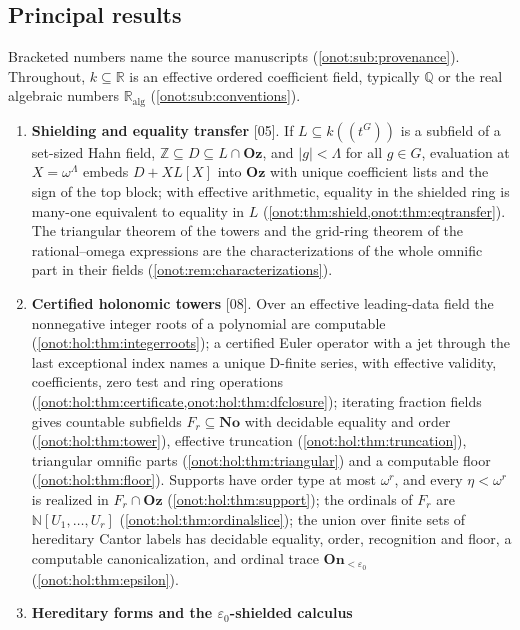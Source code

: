 \documentclass[11pt,oneside]{article}
\numberwithin{equation}{section}
\theoremstyle{definition}
\theoremstyle{remark}
\newcommand{\No}{\mathbf{No}}
\newcommand{\Oz}{\mathbf{Oz}}
\newcommand{\On}{\mathbf{On}}
\newcommand{\N}{\mathbb N}
\newcommand{\Z}{\mathbb Z}
\newcommand{\Q}{\mathbb Q}
\newcommand{\R}{\mathbb R}
\newcommand{\Ralg}{\R_{\mathrm{alg}}}
\newcommand{\src}[1]{\textup{\textsf{\small[#1]}}}
\begin{document}
\subsection{Principal results}\label{onot:sub:results}

Bracketed numbers name the source manuscripts (\cref{onot:sub:provenance}).
Throughout, $k\subseteq\R$ is an effective ordered coefficient field, typically
$\Q$ or the real algebraic numbers $\Ralg$ (\cref{onot:sub:conventions}).

\begin{enumerate}[label=\textup{(\arabic*)},leftmargin=*,itemsep=3pt]
\item \textbf{Shielding and equality transfer} \src{05}. If $L\subseteq
k((t^G))$ is a subfield of a set-sized Hahn field, $\Z\subseteq D\subseteq
L\cap\Oz$, and $|g|<\Lambda$ for all $g\in G$, evaluation at $X=\omega^\Lambda$
embeds $D+XL[X]$ into $\Oz$ with unique coefficient lists and the sign of the top
block; with effective arithmetic, equality in the shielded ring is many-one
equivalent to equality in $L$ (\cref{onot:thm:shield,onot:thm:eqtransfer}). The
triangular theorem of the towers and the grid-ring theorem of the rational--omega
expressions are the characterizations of the whole omnific part in their fields
(\cref{onot:rem:characterizations}).
\item \textbf{Certified holonomic towers} \src{08}. Over an effective
leading-data field the nonnegative integer roots of a polynomial are computable
(\cref{onot:hol:thm:integerroots}); a certified Euler operator with a jet through
the last exceptional index names a unique D-finite series, with effective
validity, coefficients, zero test and ring operations
(\cref{onot:hol:thm:certificate,onot:hol:thm:dfclosure}); iterating fraction
fields gives countable subfields $F_r\subseteq\No$ with decidable equality and
order (\cref{onot:hol:thm:tower}), effective truncation
(\cref{onot:hol:thm:truncation}), triangular omnific parts
(\cref{onot:hol:thm:triangular}) and a computable floor
(\cref{onot:hol:thm:floor}). Supports have order type at most $\omega^r$, and
every $\eta<\omega^r$ is realized in $F_r\cap\Oz$ (\cref{onot:hol:thm:support});
the ordinals of $F_r$ are $\N[U_1,\ldots,U_r]$ (\cref{onot:hol:thm:ordinalslice});
the union over finite sets of hereditary Cantor labels has decidable equality,
order, recognition and floor, a computable canonicalization, and ordinal trace
$\On_{<\varepsilon_0}$ (\cref{onot:hol:thm:epsilon}).
\item \textbf{Hereditary forms and the $\varepsilon_0$-shielded calculus}

\end{enumerate}
\end{document}
